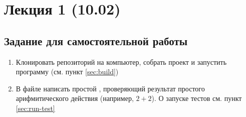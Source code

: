 \section{Лекция 1 (10.02)}


\subsection{Задание для самостоятельной работы}
\begin{enumerate}
\item Клонировать репозиторий  на компьютер,
      собрать проект и запустить программу  (см. пункт \ref{sec:build})
\item В файле  написать простой , проверяющий результат простого арифмитического действия (например, $2 + 2$).
      О запуске тестов см. пункт \ref{sec:run-test}
\end{enumerate}
